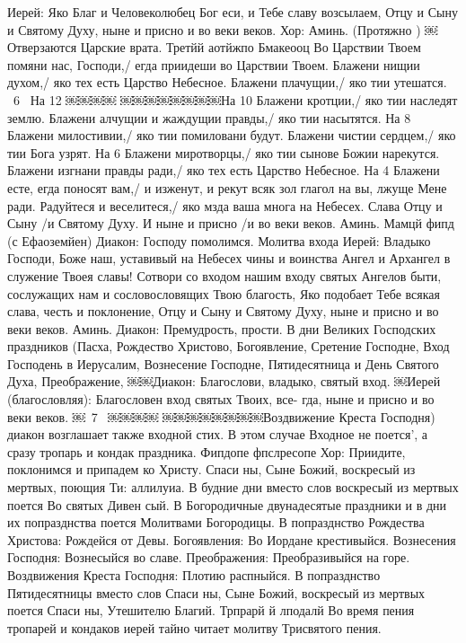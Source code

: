 Иерей: Яко Благ и Человеколюбец Бог еси, и Тебе славу возсылаем, Отцу и Сыну и Святому Духу, ныне и присно и во веки веков.
Хор: Аминь. (Протяжно )
￼Отверзаются Царские врата.
Третйй аотйжпо Бмакеооц
Во Царствии Твоем помяни нас, Господи,/ егда приидеши во
Царствии Твоем.
Блажени нищии духом,/ яко тех есть Царство Небесное.
Блажени плачущии,/ яко тии утешатся. ~6~
На 12
￼￼￼￼
￼￼￼￼￼￼￼￼На 10
Блажени кротции,/ яко тии наследят землю.
Блажени алчущии и жаждущии правды,/ яко тии насытятся.
На 8
Блажени милостивии,/ яко тии помиловани будут. Блажени чистии сердцем,/ яко тии Бога узрят.
На 6
Блажени миротворцы,/ яко тии сынове Божии нарекутся. Блажени изгнани правды ради,/ яко тех есть Царство
Небесное.
На 4
Блажени есте, егда поносят вам,/ и изженут, и рекут всяк зол глагол на вы, лжуще Мене ради.
Радуйтеся и веселитеся,/ яко мзда ваша многа на Небесех. Слава Отцу и Сыну /и Святому Духу.
И ныне и присно /и во веки веков. Аминь.
Мамцй фипд (с Ефаоземйен)
Диакон: Господу помолимся.
Молитва входа
Иерей: Владыко Господи, Боже наш, уставивый на Небесех чины и воинства Ангел и Архангел в
служение Твоея славы! Сотвори со входом нашим входу святых Ангелов быти, сослужащих нам и сословословящих Твою благость, Яко подобает Тебе всякая слава, честь и поклонение, Отцу и Сыну и Святому Духу, ныне и присно и во веки веков. Аминь.
Диакон: Премудрость, прости.
В дни Великих Господских праздников (Пасха, Рождество Христово, Богоявление, Сретение Господне, Вход
Господень в Иерусалим, Вознесение Господне, Пятидесятница и День Святого Духа, Преображение,
￼￼Диакон: Благослови, владыко, святый вход.
￼Иерей (благословляя): Благословен вход святых Твоих, все- гда, ныне и присно и во веки веков.
￼~7~
￼￼￼￼
￼￼￼￼￼￼￼￼Воздвижение Креста Господня) диакон возглашает также входной стих. В этом случае Входное не поется', а сразу тропарь и кондак праздника.
Фипдопе фпслресопе
Хор: Приидите, поклонимся и припадем ко Христу. Спаси ны, Сыне Божий, воскресый из мертвых, поющия Ти: аллилуиа.
В будние дни вместо слов воскресый из мертвых поется Во святых Дивен сый.
В Богородичные двунадесятые праздники и в дни их попразднства поется Молитвами Богородицы.
В попразднство Рождества Христова: Рождейся от Девы.
Богоявления: Во Иордане крестивыйся.
Вознесения Господня: Вознесыйся во славе.
Преображения: Преобразивыйся на горе.
Воздвижения Креста Господня: Плотию распныйся.
В попразднство Пятидесятницы вместо слов Спаси ны, Сыне Божий, воскресый из мертвых поется Спаси ны, Утешителю Благий.
Трпрарй й лподалй
Во время пения тропарей и кондаков иерей тайно читает молитву Трисвятого пения.

